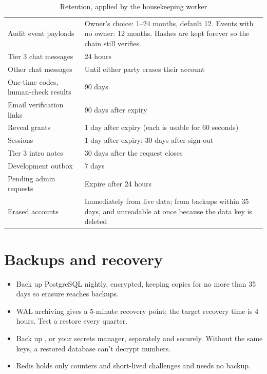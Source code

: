 \begin{table}[H]
\centering\small
\caption{Retention, applied by the housekeeping worker}\label{tab:retention}
\begin{tabularx}{\linewidth}{@{}L{5.2cm}Y@{}}
\toprule
{} &  \\
\midrule
Audit event payloads & Owner's choice: 1--24 months, default 12. Events with no owner: 12 months. Hashes are kept forever so the chain still verifies. \\
Tier 3 chat messages & 24 hours \\
Other chat messages & Until either party erases their account \\
One-time codes, human-check results & 90 days \\
Email verification links & 90 days after expiry \\
Reveal grants & 1 day after expiry (each is usable for 60 seconds) \\
Sessions & 1 day after expiry; 30 days after sign-out \\
Tier 3 intro notes & 30 days after the request closes \\
Development outbox & 7 days \\
Pending admin requests & Expire after 24 hours \\
Erased accounts & Immediately from live data; from backups within 35 days, and unreadable at once because the data key is deleted \\
\bottomrule
\end{tabularx}
\end{table}

\section{Backups and recovery}

\begin{itemize}
  \item Back up PostgreSQL nightly, encrypted, keeping copies for no more than 35 days so erasure reaches backups.
  \item WAL archiving gives a 5-minute recovery point; the target recovery time is 4 hours. Test a restore every quarter.
  \item Back up , or your secrets manager, separately and securely. Without the same keys, a restored database can't decrypt numbers.
  \item Redis holds only counters and short-lived challenges and needs no backup.
\end{itemize}

